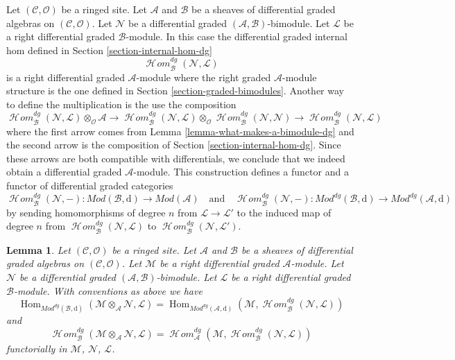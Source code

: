 \documentclass{stacks-project}
\theoremstyle{plain}
\newtheorem{lemma}[subsection]{Lemma}
\theoremstyle{definition}
\theoremstyle{remark}
\numberwithin{equation}{subsection}
\def\Hom{\mathop{\mathrm{Hom}}\nolimits}
\def\SheafHom{\mathop{\mathcal{H}\!\mathit{om}}\nolimits}
\begin{document}
\medskip\noindent
Let $(\mathcal{C}, \mathcal{O})$ be a ringed site. Let $\mathcal{A}$
and $\mathcal{B}$ be a sheaves of differential graded algebras on
$(\mathcal{C}, \mathcal{O})$. Let $\mathcal{N}$ be a
differential graded $(\mathcal{A}, \mathcal{B})$-bimodule. Let 
$\mathcal{L}$ be a right differential graded $\mathcal{B}$-module.
In this case the differential graded internal hom
defined in Section \ref{section-internal-hom-dg}
$$
\SheafHom_\mathcal{B}^{dg}(\mathcal{N}, \mathcal{L})
$$
is a right differential graded $\mathcal{A}$-module where the
right graded $\mathcal{A}$-module structure is the one defined
in Section \ref{section-graded-bimodules}. Another way to define
the multiplication is the use the composition
$$
\SheafHom_\mathcal{B}^{dg}(\mathcal{N}, \mathcal{L})
\otimes_\mathcal{O} \mathcal{A}
\to
\SheafHom_\mathcal{B}^{dg}(\mathcal{N}, \mathcal{L})
\otimes_\mathcal{O} \SheafHom_\mathcal{B}^{dg}(\mathcal{N}, \mathcal{N})
\to
\SheafHom_\mathcal{B}^{dg}(\mathcal{N}, \mathcal{L})
$$
where the first arrow comes from Lemma \ref{lemma-what-makes-a-bimodule-dg}
and the second arrow is the composition of
Section \ref{section-internal-hom-dg}. Since these arrows are
both compatible with differentials, we conclude that we indeed
obtain a differential graded $\mathcal{A}$-module.
This construction
defines a functor and a functor of differential graded categories
$$
\SheafHom_\mathcal{B}^{dg}(\mathcal{N}, -) :
\textit{Mod}(\mathcal{B}, \text{d})
\longrightarrow
\textit{Mod}(\mathcal{A})
\quad\text{and}\quad
\SheafHom_\mathcal{B}^{dg}(\mathcal{N}, -) :
\textit{Mod}^{dg}(\mathcal{B}, \text{d})
\longrightarrow
\textit{Mod}^{dg}(\mathcal{A}, \text{d})
$$
by sending homomorphisms of degree $n$ from $\mathcal{L} \to \mathcal{L}'$
to the induced map of degree $n$ from
$\SheafHom_\mathcal{B}^{dg}(\mathcal{N}, \mathcal{L})$ to
$\SheafHom_\mathcal{B}^{dg}(\mathcal{N}, \mathcal{L}')$.

\begin{lemma}
\label{lemma-tensor-hom-adjunction-dg}
Let $(\mathcal{C}, \mathcal{O})$ be a ringed site. Let $\mathcal{A}$
and $\mathcal{B}$ be a sheaves of differential graded algebras on
$(\mathcal{C}, \mathcal{O})$. Let $\mathcal{M}$ be a right
differential graded $\mathcal{A}$-module. Let $\mathcal{N}$ be a
differential graded $(\mathcal{A}, \mathcal{B})$-bimodule. Let $\mathcal{L}$
be a right differential graded $\mathcal{B}$-module. With conventions as above
we have
$$
\Hom_{\textit{Mod}^{dg}(\mathcal{B}, \text{d})}(
\mathcal{M} \otimes_\mathcal{A} \mathcal{N}, \mathcal{L}) =
\Hom_{\textit{Mod}^{dg}(\mathcal{A}, \text{d})}(
\mathcal{M}, \SheafHom_\mathcal{B}^{dg}(\mathcal{N}, \mathcal{L}))
$$
and
$$
\SheafHom_\mathcal{B}^{dg}(
\mathcal{M} \otimes_\mathcal{A} \mathcal{N}, \mathcal{L}) =
\SheafHom_\mathcal{A}^{dg}(
\mathcal{M}, \SheafHom_\mathcal{B}^{dg}(\mathcal{N}, \mathcal{L}))
$$
functorially in $\mathcal{M}$, $\mathcal{N}$, $\mathcal{L}$.
\end{lemma}
\end{document}
